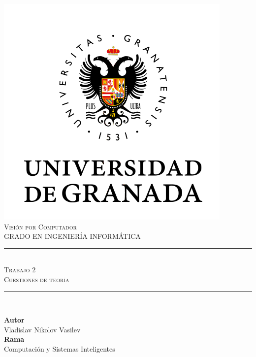 \documentclass[11pt,a4paper]{article}
\newcommand{\asignatura}{Visión por Computador}
\newcommand{\autor}{Vladislav Nikolov Vasilev}
\newcommand{\titulo}{Trabajo 2}
\newcommand{\subtitulo}{Cuestiones de teoría}
\begin{document}

\begin{titlepage}

\begin{minipage}{\textwidth}

\centering

\includegraphics[scale=0.5]{img/ugr.png}\\

\textsc{\Large \asignatura{}\\[0.2cm]}
\textsc{GRADO EN INGENIERÍA INFORMÁTICA}\\[1cm]

\noindent\rule[-1ex]{\textwidth}{1pt}\\[1.5ex]
\textsc{{\Huge \titulo\\[0.5ex]}}
\textsc{{\Large \subtitulo\\}}
\noindent\rule[-1ex]{\textwidth}{2pt}\\[3.5ex]

\end{minipage}

\vspace{0.5cm}

\begin{minipage}{\textwidth}

\centering

\textbf{Autor}\\ {\autor{}}\\[2.5ex]
\textbf{Rama}\\ {Computación y Sistemas Inteligentes}\\[2.5ex]
\vspace{0.3cm}


\end{minipage}
\end{titlepage}
\end{document}
